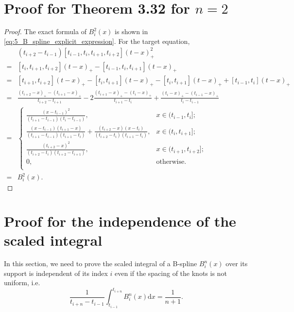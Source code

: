\documentclass[a4paper]{article}
\begin{document}
\section{Proof for Theorem 3.32 for $n = 2$}

\begin{proof}
  The exact formula of $B_i^2(x)$ is shown in \cref{eq:5_B_spline_explicit_expression}. For the target equation, 
  \begin{equation}
    \begin{aligned}
      & (t_{i + 2} - t_{i - 1})[t_{i - 1}, t_{i}, t_{i + 1}, t_{i + 2}](t - x)_{+}^2 \\
      =& [t_i, t_{i + 1}, t_{i + 2}](t - x)_{+} - [t_{i - 1}, t_{i}, t_{i + 1}](t - x)_{+} \\
      =& [t_{i + 1}, t_{i + 2}](t - x)_{+} - [t_{i}, t_{i + 1}](t - x)_{+} - [t_i, t_{i + 1}](t - x)_{+} + [t_{i - 1}, t_i](t - x)_{+} \\
      =& \frac{(t_{i + 2} - x)_{+} - (t_{i + 1} - x)_{+}}{t_{i + 2} - t_{i + 1}} - 2\frac{(t_{i + 1} - x)_{+} - (t_{i} - x)_{+}}{t_{i + 1} - t_{i}} + \frac{(t_i - x)_{+} - (t_{i - 1} - x)_{+}}{t_i - t_{i - 1}} \\
      =& \begin{cases}
        \frac{(x - t_{i - 1})^2}{(t_{i + 1} - t_{i - 1})(t_i - t_{i - 1})},& x \in (t_{i - 1}, t_i]; \\
        \frac{(x - t_{i - 1})(t_{i + 1} - x)}{(t_{i + 1} - t_{i - 1})(t_{i + 1} - t_i)} + \frac{(t_{i + 2} - x)(x - t_i)}{(t_{i + 2} - t_i)(t_{i + 1} - t_i)},& x \in (t_i, t_{i + 1}]; \\
        \frac{(t_{i + 2} - x)^2}{(t_{i + 2} - t_i)(t_{i + 2} - t_{i + 1})},& x \in (t_{i + 1}, t_{i + 2}]; \\
        0,& \text{otherwise}. \\        
      \end{cases} \\
      =& B_i^2(x).
    \end{aligned}
    \label{eq:6_proof}
  \end{equation}
\end{proof}

\section{Proof for the independence of the scaled integral}

In this section, we need to prove the scaled integral of a B-spline $B_i^n(x)$ over its support is independent of its index $i$ even if the spacing of the knots is not uniform, i.e.
\begin{equation}
  \frac{1}{t_{i + n} - t_{i - 1}} \int_{t_{i - 1}}^{t_{i + n}} B_i^n(x) \mathrm{d}x = \frac{1}{n + 1}.
  \label{eq:7_target_equation}
\end{equation}
\end{document}

